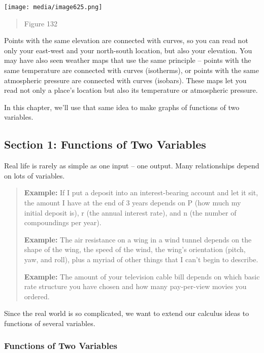 \texttt{[image: media/image625.png]}

\begin{quote}
Figure 132
\end{quote}

Points with the same elevation are connected with curves, so you can
read not only your east-west and your north-south location, but also
your elevation. You may have also seen weather maps that use the same
principle -- points with the same temperature are connected with curves
(isotherms), or points with the same atmospheric pressure are connected
with curves (isobars). These maps let you read not only a place's
location but also its temperature or atmospheric pressure.

In this chapter, we'll use that same idea to make graphs of functions of
two variables.

\hypertarget{section-1-functions-of-two-variables}{\subsection{Section
1: Functions of Two
Variables}\label{section-1-functions-of-two-variables}}

Real life is rarely as simple as one input -- one output. Many
relationships depend on lots of variables.

\begin{quote}
\textbf{Example:} If I put a deposit into an interest-bearing account
and let it sit, the amount I have at the end of 3 years depends on P
(how much my initial deposit is), r (the annual interest rate), and n
(the number of compoundings per year).

\textbf{Example:} The air resistance on a wing in a wind tunnel depends
on the shape of the wing, the speed of the wind, the wing's orientation
(pitch, yaw, and roll), plus a myriad of other things that I can't begin
to describe.

\textbf{Example:} The amount of your television cable bill depends on
which basic rate structure you have chosen and how many pay-per-view
movies you ordered.
\end{quote}

Since the real world is so complicated, we want to extend our calculus
ideas to functions of several variables.

\subsubsection{Functions of Two
Variables}\label{functions-of-two-variables}

